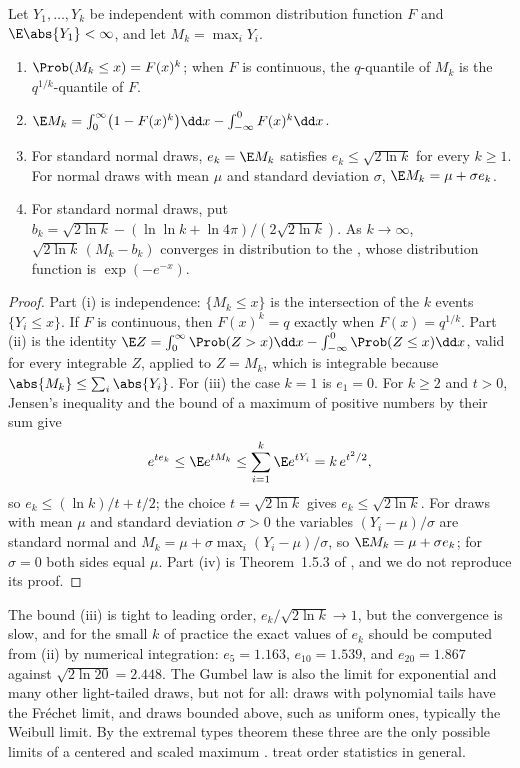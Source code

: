 \begin{refsection}
\begin{proposition}\label{thm:toolkit:orderstat}
Let $Y_1,\dots,Y_k$ be independent with common distribution function $F$ and $\E\abs{Y_1}<\infty$, and let $M_k=\max_iY_i$.
\begin{enumerate}
\item $\Prob(M_k\le x)=F(x)^k$; when $F$ is continuous, the $q$-quantile of $M_k$ is the $q^{1/k}$-quantile of $F$.
\item $\E M_k=\int_0^\infty\bigl(1-F(x)^k\bigr)\dd x-\int_{-\infty}^0F(x)^k\dd x$.
\item For standard normal draws, $e_k=\E M_k$ satisfies $e_k\le\sqrt{2\ln k}$ for every $k\ge1$. For normal draws with mean $\mu$ and standard deviation $\sigma$, $\E M_k=\mu+\sigma e_k$.
\item For standard normal draws, put $b_k=\sqrt{2\ln k}-(\ln\ln k+\ln4\pi)/(2\sqrt{2\ln k})$. As $k\to\infty$, $\sqrt{2\ln k}\,(M_k-b_k)$ converges in distribution to the , whose distribution function is $\exp(-e^{-x})$.
\end{enumerate}
\end{proposition}

\begin{proof}
Part (i) is independence: $\{M_k\le x\}$ is the intersection of the $k$ events $\{Y_i\le x\}$. If $F$ is continuous, then $F(x)^k=q$ exactly when $F(x)=q^{1/k}$. Part (ii) is the identity $\E Z=\int_0^\infty\Prob(Z>x)\dd x-\int_{-\infty}^0\Prob(Z\le x)\dd x$, valid for every integrable $Z$, applied to $Z=M_k$, which is integrable because $\abs{M_k}\le\sum_i\abs{Y_i}$. For (iii) the case $k=1$ is $e_1=0$. For $k\ge2$ and $t>0$, Jensen's inequality and the bound of a maximum of positive numbers by their sum give
\[
e^{te_k}\le\E e^{tM_k}\le\sum_{i=1}^k\E e^{tY_i}=k\,e^{t^2/2},
\]
so $e_k\le(\ln k)/t+t/2$; the choice $t=\sqrt{2\ln k}$ gives $e_k\le\sqrt{2\ln k}$. For draws with mean $\mu$ and standard deviation $\sigma>0$ the variables $(Y_i-\mu)/\sigma$ are standard normal and $M_k=\mu+\sigma\max_i(Y_i-\mu)/\sigma$, so $\E M_k=\mu+\sigma e_k$; for $\sigma=0$ both sides equal $\mu$. Part (iv) is Theorem~1.5.3 of \textcite{LeadbetterLindgrenRootzen1983}, and we do not reproduce its proof.
\end{proof}

The bound (iii) is tight to leading order, $e_k/\sqrt{2\ln k}\to1$, but the convergence is slow, and for the small $k$ of practice the exact values of $e_k$ should be computed from (ii) by numerical integration: $e_5=1.163$, $e_{10}=1.539$, and $e_{20}=1.867$ against $\sqrt{2\ln20}=2.448$. The Gumbel law is also the limit for exponential and many other light-tailed draws, but not for all: draws with polynomial tails have the Fréchet limit, and draws bounded above, such as uniform ones, typically the Weibull limit. By the extremal types theorem these three are the only possible limits of a centered and scaled maximum \parencite[Chapter~1]{LeadbetterLindgrenRootzen1983}. \Textcite{DavidNagaraja2003} treat order statistics in general.


\end{refsection}
